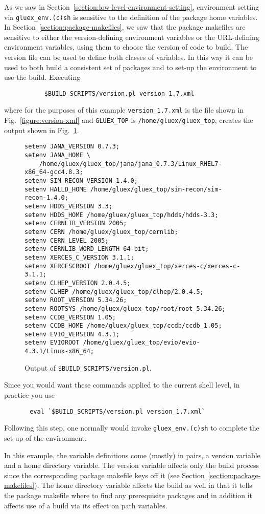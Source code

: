 \documentclass[12pt]{article}
\begin{document}
As we saw in Section~\ref{section:low-level-environment-setting},
environment setting via {\tt gluex\_env.(c)sh} is sensitive to the
definition of the package home variables. In
Section~\ref{section:package-makefiles}, we saw that the package
makefiles are sensitive to either the version-defining environment
variables or the URL-defining environment variables, using them to choose the
version of code to build. The version file can be used to define both
classes of variables. In this way it can be used to both build a
consistent set of packages and to set-up the environment to use the
build. Executing
\begin{verbatim}
           $BUILD_SCRIPTS/version.pl version_1.7.xml
\end{verbatim}
where for the purposes of this example {\tt version\_1.7.xml} is the
file shown in Fig.~\ref{figure:version-xml} and {\tt GLUEX\_TOP} is
{\tt /home/gluex/gluex\_top}, creates the output shown in
Fig.~\ref{figure:version-pl-output}.
\begin{figure}
\small
\begin{verbatim}
setenv JANA_VERSION 0.7.3;
setenv JANA_HOME \
    /home/gluex/gluex_top/jana/jana_0.7.3/Linux_RHEL7-x86_64-gcc4.8.3;
setenv SIM_RECON_VERSION 1.4.0;
setenv HALLD_HOME /home/gluex/gluex_top/sim-recon/sim-recon-1.4.0;
setenv HDDS_VERSION 3.3;
setenv HDDS_HOME /home/gluex/gluex_top/hdds/hdds-3.3;
setenv CERNLIB_VERSION 2005;
setenv CERN /home/gluex/gluex_top/cernlib;
setenv CERN_LEVEL 2005;
setenv CERNLIB_WORD_LENGTH 64-bit;
setenv XERCES_C_VERSION 3.1.1;
setenv XERCESCROOT /home/gluex/gluex_top/xerces-c/xerces-c-3.1.1;
setenv CLHEP_VERSION 2.0.4.5;
setenv CLHEP /home/gluex/gluex_top/clhep/2.0.4.5;
setenv ROOT_VERSION 5.34.26;
setenv ROOTSYS /home/gluex/gluex_top/root/root_5.34.26;
setenv CCDB_VERSION 1.05;
setenv CCDB_HOME /home/gluex/gluex_top/ccdb/ccdb_1.05;
setenv EVIO_VERSION 4.3.1;
setenv EVIOROOT /home/gluex/gluex_top/evio/evio-4.3.1/Linux-x86_64;
\end{verbatim}
\caption{Output of {\tt \$BUILD\_SCRIPTS/version.pl}.}\label{figure:version-pl-output}
\end{figure}
Since you would want these commands applied to the current shell level, in practice you use
\begin{verbatim}
       eval `$BUILD_SCRIPTS/version.pl version_1.7.xml`
\end{verbatim}
Following this step, one normally would invoke {\tt gluex\_env.(c)sh}
to complete the set-up of the environment.

In this example, the variable definitions come (mostly) in pairs, a
version variable and a home directory variable. The version variable
affects only the build process since the corresponding package
makefile keys off it (see
Section~\ref{section:package-makefiles}). The home directory variable
affects the build as well in that it tells the package makefile where
to find any prerequisite packages and in addition it affects use of a
build via its effect on path variables.
\end{document}
